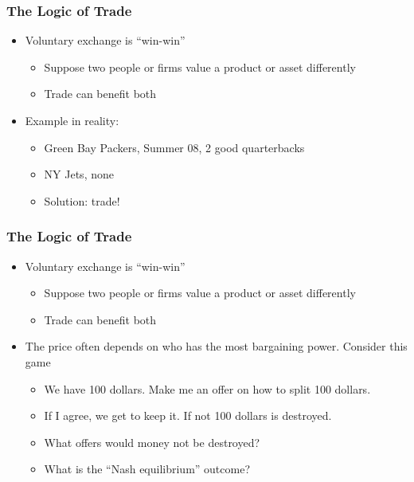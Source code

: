 \documentclass[handout]{beamer}
\begin{document}
\begin{frame}[t]
\frametitle{The Logic of Trade}
\bigskip
\begin{itemize}
\item Voluntary exchange is ``win-win''
\begin{itemize}
\medskip
\item Suppose two people or firms value a product or asset differently
\medskip
\item Trade can benefit both
\end{itemize}
\bigskip
\item Example in reality:
\begin{itemize}
\medskip
\item Green Bay Packers, Summer 08, 2 good quarterbacks
\medskip
\item NY Jets, none
\medskip
\item Solution:  trade!
\end{itemize}
\end{itemize}
\bigskip
\end{frame}


\begin{frame}[t]
\frametitle{The Logic of Trade}
\bigskip
\begin{itemize}
\item Voluntary exchange is ``win-win''
\begin{itemize}
\medskip
\item Suppose two people or firms value a product or asset differently
\medskip
\item Trade can benefit both
\end{itemize}
\bigskip
\item The price often depends on who has the most bargaining power. Consider this game
\begin{itemize}
\medskip
\item We have 100 dollars. Make me an offer on how to split 100 dollars.
\medskip
\item If I agree, we get to keep it. If not 100 dollars is destroyed.
\medskip
\item What offers would money not be destroyed?
\medskip
\item What is the ``Nash equilibrium'' outcome?
\end{itemize}
\end{itemize}
\bigskip
\end{frame}
\end{document}
